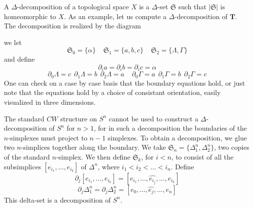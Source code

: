 \begin{example}
    A $\Delta$-decomposition of a topological space $X$ is a $\Delta$-set $\mathfrak{S}$ such that $|\mathfrak{S}|$ is homeomorphic to $X$. As an example, let us compute a $\Delta$-decomposition of $\mathbf{T}$. The decomposition is realized by the diagram
    \begin{center}
    \end{center}
    we let
    \[ \mathfrak{S}_0 = \{ \alpha \}\ \ \ \ \ \mathfrak{S}_1 = \{ a, b, c \}\ \ \ \ \ \mathfrak{S}_2 = \{ \Lambda, \Gamma \} \]
    and define
    \[ \partial_i a = \partial_i b = \partial_i c = \alpha \]
    \[ \partial_0 \Lambda = c\ \ \partial_1 \Lambda = b\ \ \partial_2 \Lambda = a\ \ \ \ \ \partial_0 \Gamma = a\ \ \partial_1 \Gamma = b\ \ \partial_2 \Gamma = c \]
    One can check on a case by case basis that the boundary equations hold, or just note that the equations hold by a choice of consistant orientation, easily visualized in three dimensions.
\end{example}

\begin{example}
    The standard $CW$ structure on $S^n$ cannot be used to construct a $\Delta$-decomposition of $S^n$ for $n > 1$, for in such a decomposition the boundaries of the $n$-simplexes must project to $n-1$ simplexes. To obtain a decomposition, we glue two $n$-simplices together along the boundary. We take $\mathfrak{S}_n = \{ \Delta^n_1, \Delta^n_2 \}$, two copies of the standard $n$-simplex. We then define $\mathfrak{S}_k$, for $i < n$, to consist of all the subsimplices $[e_{i_1}, \dots, e_{i_k}]$ of $\Delta^n$, where $i_1 < i_2 < \dots < i_n$. Define
    \[ \partial_j [e_{i_1}, \dots, e_{i_k}] = [e_{i_1}, \dots, \widehat{e_{i_j}}, \dots, e_{i_k}] \]
    \[ \partial_j \Delta^n_1 = \partial_j \Delta^n_2 = [e_0, \dots, \widehat{e_j}, \dots, e_n] \]
    This delta-set is a decomposition of $S^n$.
\end{example}

